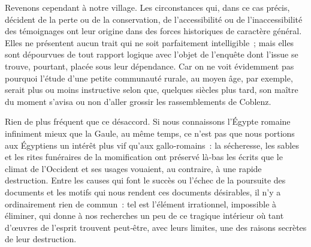\documentclass[french,twoside]{book} %
\begin{document}
\noindent Revenons cependant à notre village. Les circonstances qui, dans ce cas précis, décident de la perte ou de la conservation, de l’accessibilité ou de l’inaccessibilité des témoignages ont leur origine dans des forces historiques de caractère général. Elles ne présentent aucun trait qui ne soit parfaitement intelligible ; mais elles sont dépourvues de tout rapport logique avec l’objet de l’enquête dont l’issue se trouve, pourtant, placée sous leur dépendance. Car on ne voit évidemment pas pourquoi l’étude d’une petite communauté rurale, au moyen âge, par exemple, serait plus ou moins instructive selon que, quelques siècles plus tard, son maître du moment s’avisa ou non d’aller grossir les rassemblements de Coblenz.\par
\label{p33} Rien de plus fréquent que ce désaccord. Si nous connaissons l’Égypte romaine infiniment mieux que la Gaule, au même temps, ce n’est pas que nous portions aux Égyptiens un intérêt plus vif qu’aux gallo‑romains : la sécheresse, les sables et les rites funéraires de la momification ont pré­servé là‑bas les écrits que le climat de l’Occident et ses usages vouaient, au contraire, à une rapide destruction. Entre les causes qui font le succès ou l’échec de la poursuite des documents et les motifs qui nous rendent ces documents désirables, il n’y a ordinairement rien de commun : tel est l’élément irrationnel, impossible à éliminer, qui donne à nos recherches un peu de ce tragique intérieur où tant d’œuvres de l’esprit trouvent peut‑être, avec leurs limites, une des raisons secrètes de leur destruction.\par
\end{document}
